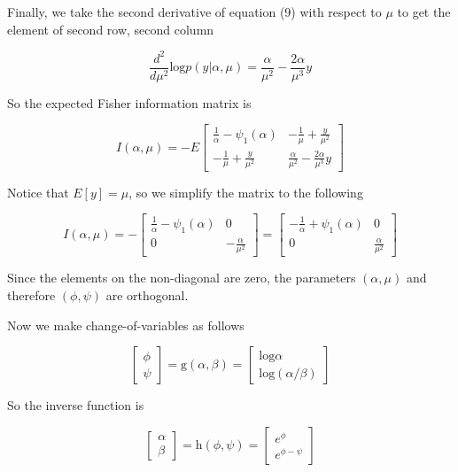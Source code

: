 \documentclass[12pt]{article}
\begin{document}
Finally, we take the second derivative of equation (9) with respect to $\mu$ to get the element of second row, second column

\begin{equation}
\frac{d^2}{d\mu^2}\text{log}p(y|\alpha,\mu)=\frac{\alpha}{\mu^2}-\frac{2\alpha}{\mu^3}y
\end{equation}

So the expected Fisher information matrix is 

\begin{equation}
I(\alpha,\mu) = -E
\begin{bmatrix}
\frac{1}{\alpha}-\psi_1(\alpha) & -\frac{1}{\mu}+\frac{y}{\mu^2} \\ 
-\frac{1}{\mu}+\frac{y}{\mu^2} & \frac{\alpha}{\mu^2}-\frac{2\alpha}{\mu^3}y
\end{bmatrix}
\end{equation}

Notice that $E[y]=\mu$, so we simplify the matrix to the following

\begin{equation}
I(\alpha,\mu) = -
\begin{bmatrix}
\frac{1}{\alpha}-\psi_1(\alpha) & 0 \\ 
0 & -\frac{\alpha}{\mu^2}
\end{bmatrix} = 
\begin{bmatrix}
-\frac{1}{\alpha}+\psi_1(\alpha) & 0 \\ 
0 & \frac{\alpha}{\mu^2}
\end{bmatrix}
\end{equation}

Since the elements on the non-diagonal are zero, the parameters $(\alpha,\mu)$ and therefore $(\phi,\psi)$ are orthogonal.

Now we make change-of-variables as follows

\begin{equation}
\begin{bmatrix}
\phi \\ 
\psi
\end{bmatrix} = \text{g}(\alpha, \beta) = 
\begin{bmatrix} 
\text{log} \alpha \\
\text{log}(\alpha / \beta)
\end{bmatrix}
\end{equation}

So the inverse function is 

\begin{equation}
\begin{bmatrix}
\alpha \\ 
\beta
\end{bmatrix} = \text{h}(\phi, \psi) = 
\begin{bmatrix} 
e^{\phi} \\
e^{\phi-\psi}
\end{bmatrix}
\end{equation}
\end{document}
